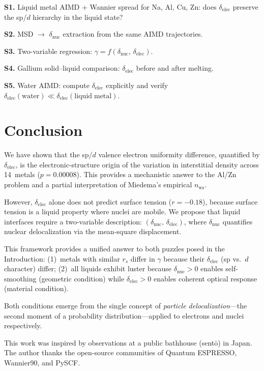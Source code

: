 \documentclass[twocolumn,showpacs,preprintnumbers,amsmath,amssymb,prb]{revtex4-2}
\begin{document}
\textbf{S1.} Liquid metal AIMD + Wannier spread
for Na, Al, Cu, Zn: does $\delta_\mathrm{elec}$
preserve the sp/$d$ hierarchy in the liquid state?

\textbf{S2.} MSD $\to$ $\delta_\mathrm{nuc}$ extraction
from the same AIMD trajectories.

\textbf{S3.} Two-variable regression:
$\gamma = f(\delta_\mathrm{nuc},\,\delta_\mathrm{elec})$.

\textbf{S4.} Gallium solid--liquid comparison:
$\delta_\mathrm{elec}$ before and after melting.

\textbf{S5.} Water AIMD: compute $\delta_\mathrm{elec}$
explicitly and verify
$\delta_\mathrm{elec}(\mathrm{water})
\ll \delta_\mathrm{elec}(\mathrm{liquid\;metal})$.


\section{Conclusion}
\label{sec:conclusion}

We have shown that the sp/$d$ valence electron uniformity
difference, quantified by $\delta_\mathrm{elec}$,
is the electronic-structure origin of the variation in
interstitial density across 14~metals
($p = 0.00008$).
This provides a mechanistic answer to the Al/Zn problem
and a partial interpretation of Miedema's empirical
$n_\mathrm{ws}$.

However, $\delta_\mathrm{elec}$ alone does not predict
surface tension ($r = -0.18$), because surface tension
is a liquid property where nuclei are mobile.
We propose that liquid interfaces require a two-variable
description:
$(\delta_\mathrm{nuc},\,\delta_\mathrm{elec})$,
where $\delta_\mathrm{nuc}$ quantifies nuclear delocalization
via the mean-square displacement.

This framework provides a unified answer to both puzzles
posed in the Introduction:
(1)~metals with similar $r_s$ differ in $\gamma$ because
their $\delta_\mathrm{elec}$ (sp vs.\ $d$ character) differ;
(2)~all liquids exhibit luster because
$\delta_\mathrm{nuc} > 0$ enables self-smoothing
(geometric condition) while $\delta_\mathrm{elec} > 0$
enables coherent optical response (material condition).

Both conditions emerge from the single concept of
\emph{particle delocalization}---the second moment of a
probability distribution---applied to electrons and nuclei
respectively.


\begin{acknowledgments}
This work was inspired by observations at a public bathhouse
(sent\=o) in Japan.
The author thanks the open-source communities of
Quantum ESPRESSO, Wannier90, and PySCF.
\end{acknowledgments}



\end{document}
